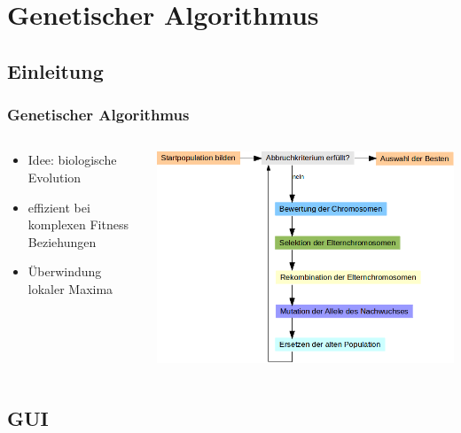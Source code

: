 \section{Genetischer Algorithmus}

\subsection{Einleitung}

\begin{frame}
  \frametitle{Genetischer Algorithmus}
  \begin{columns}[T]
    \begin{column}{0.35\textwidth}
      \begin{itemize}
      \item Idee: biologische Evolution
      \item effizient bei komplexen Fitness Beziehungen
      \item Überwindung lokaler Maxima
      \end{itemize}
    \end{column}
    \begin{column}{0.65\textwidth}
        \includegraphics[width=\textwidth]{GenAlg-Diagramm.png}
    \end{column}
  \end{columns}
\end{frame}


\subsection{GUI}

